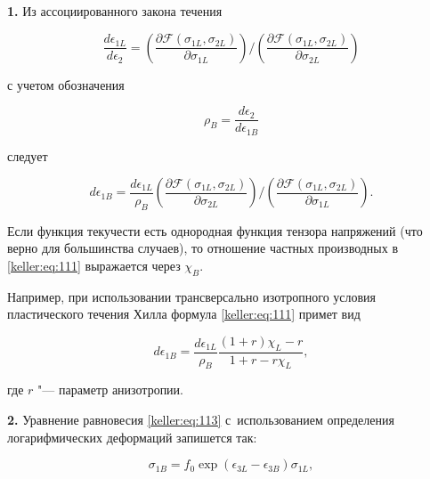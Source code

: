 \smallskip



{\bf 1.} Из ассоциированного закона течения 

$$\frac{d\epsilon_{1L}}{d\epsilon_2} = \left(\frac{\partial \mathcal{F}\left( \sigma_{1L},\sigma_{2L} \right)}{\partial \sigma_{1L}}\right) \Big/ \left(\frac{\partial \mathcal{F}\left( \sigma_{1L},\sigma_{2L} \right)}{\partial \sigma_{2L}}\right)$$ 

с учетом обозначения 

$$

\rho_B = \frac{d\epsilon_2}{d\epsilon_{1B}}

$$ 

следует 

\begin{equation}\label{keller:eq:111}

d\epsilon_{1B} = \frac{d\epsilon_{1L}}{\rho_B} \left(\frac{\partial \mathcal{F}\left( \sigma_{1L},\sigma_{2L} \right)}{\partial \sigma_{2L}}\right) \Big/ \left(\frac{\partial \mathcal{F}\left( \sigma_{1L},\sigma_{2L} \right)}{\partial \sigma_{1L}}\right).

\end{equation} 

Если функция текучести есть однородная функция тензора напряжений (что верно для большинства случаев), то отношение частных производных в \eqref{keller:eq:111} выражается через $\chi_B$. 

Например, при использовании трансверсально изотропного условия пластического течения Хилла формула \eqref{keller:eq:111} примет вид 

$$

d\epsilon_{1B} = \frac{d\epsilon_{1L}}{\rho_B} \frac{(1+r) \chi_L - r}{1+r - r \chi_L},

$$ 

где $r$ "--- параметр анизотропии.



\smallskip



{\bf 2.} Уравнение равновесия \eqref{keller:eq:113} с~использованием определения логарифмических деформаций запишется так:

\begin{equation}

\label{keller:eq:112}

\sigma_{1B} = f_0\exp\left( \epsilon_{3L} - \epsilon_{3B} \right)\sigma_{1L},

\end{equation} 

